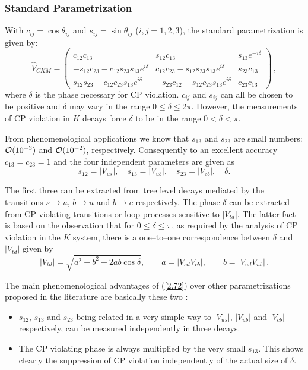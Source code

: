 \documentclass[12pt]{article}
\newcommand{\ord}{{\cal O}}
\begin{document}
\begin{itemize}
\subsubsection{Standard Parametrization}
            \label{sec:sewm:stdparam}
With
$c_{ij}=\cos\theta_{ij}$ and $s_{ij}=\sin\theta_{ij}$ 
($i,j=1,2,3$), the standard parametrization is
given by:
\begin{equation}\label{2.72}
\hat V_{CKM}=
\left(\begin{array}{ccc}
c_{12}c_{13}&s_{12}c_{13}&s_{13}e^{-i\delta}\\ -s_{12}c_{23}
-c_{12}s_{23}s_{13}e^{i\delta}&c_{12}c_{23}-s_{12}s_{23}s_{13}e^{i\delta}&
s_{23}c_{13}\\ s_{12}s_{23}-c_{12}c_{23}s_{13}e^{i\delta}&-s_{23}c_{12}
-s_{12}c_{23}s_{13}e^{i\delta}&c_{23}c_{13}
\end{array}\right)\,,
\end{equation}
where $\delta$ is the phase necessary for {\rm CP} violation.
$c_{ij}$ and
$s_{ij}$ can all be chosen to be positive
and  $\delta$ may vary in the
range $0\le\delta\le 2\pi$. However, the measurements
of CP violation in $K$ decays force $\delta$ to be in the range
 $0<\delta<\pi$. 

From phenomenological applications we know that 
$s_{13}$ and $s_{23}$ are small numbers: $\ord(10^{-3})$ and ${\cal
O}(10^{-2})$,
respectively. Consequently to an excellent accuracy $c_{13}=c_{23}=1$
and the four independent parameters are given as 
\begin{equation}\label{2.73}
s_{12}=| V_{us}|, \quad s_{13}=| V_{ub}|, \quad s_{23}=|
V_{cb}|, \quad \delta.
\end{equation}

The first three can be extracted from tree level decays mediated
by the transitions $s \to u$, $b \to u$ and $b \to c$ respectively.
The phase $\delta$ can be extracted from CP violating transitions or 
loop processes sensitive to $| V_{td}|$. The latter fact is based
on the observation that
 for $0\le\delta\le\pi$, as required by the analysis of CP violation
in the $K$ system,
there is a one--to--one correspondence between $\delta$ and $|V_{td}|$
given by
\begin{equation}\label{10}
| V_{td}|=\sqrt{a^2+b^2-2 a b \cos\delta},
\qquad
a=| V_{cd} V_{cb}|,
\qquad
b=| V_{ud} V_{ub}|\,.
\end{equation} 

The main  phenomenological advantages of (\ref{2.72}) over other
parametrizations proposed in the literature are basically these
two \cite{HALE} : 
\begin{itemize}
\item
$s_{12}$, $s_{13}$ and $s_{23}$ being related in a very simple way
to $| V_{us}|$, $| V_{ub}|$ and $|V_{cb}|$ respectively, can be
measured independently in three decays.
\item
The CP violating phase is always multiplied by the very small
$s_{13}$. This shows clearly the suppression of CP violation
independently of the actual size of $\delta$.
\end{itemize}


\end{itemize}
\end{document}
